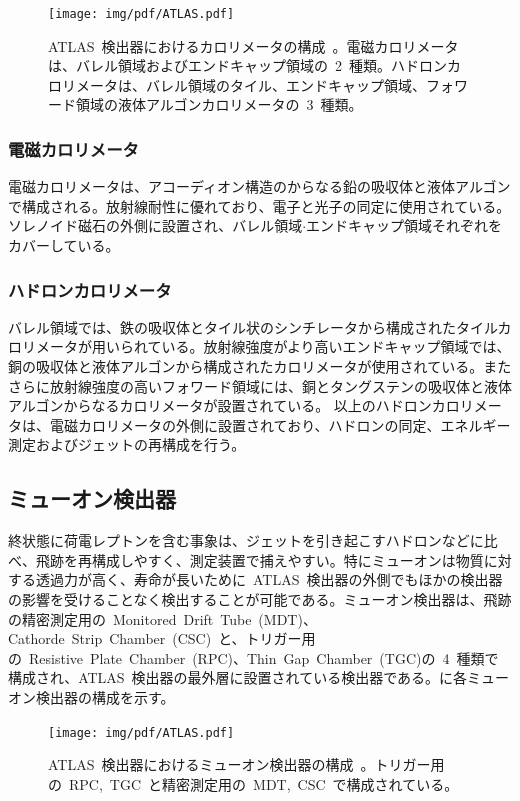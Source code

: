 \begin{figure}[tbp]
        \centering   
        \texttt{[image: img/pdf/ATLAS.pdf]}
        \caption[ATLAS~検出器におけるカロリメータの構成]{ATLAS~検出器におけるカロリメータの構成~\cite{TR:01}。電磁カロリメータは、バレル領域およびエンドキャップ領域の~2~種類。ハドロンカロリメータは、バレル領域のタイル、エンドキャップ領域、フォワード領域の液体アルゴンカロリメータの~3~種類。}\label{fig:calo}
\end{figure}

\subsubsection{電磁カロリメータ}
電磁カロリメータは、アコーディオン構造のからなる鉛の吸収体と液体アルゴンで構成される。放射線耐性に優れており、電子と光子の同定に使用されている。ソレノイド磁石の外側に設置され、バレル領域$\cdot$エンドキャップ領域それぞれをカバーしている。

\subsubsection{ハドロンカロリメータ}
バレル領域では、鉄の吸収体とタイル状のシンチレータから構成されたタイルカロリメータが用いられている。放射線強度がより高いエンドキャップ領域では、銅の吸収体と液体アルゴンから構成されたカロリメータが使用されている。またさらに放射線強度の高いフォワード領域には、銅とタングステンの吸収体と液体アルゴンからなるカロリメータが設置されている。
以上のハドロンカロリメータは、電磁カロリメータの外側に設置されており、ハドロンの同定、エネルギー測定およびジェットの再構成を行う。


\subsection{ミューオン検出器}
終状態に荷電レプトンを含む事象は、ジェットを引き起こすハドロンなどに比べ、飛跡を再構成しやすく、測定装置で捕えやすい。特にミューオンは物質に対する透過力が高く、寿命が長いために~ATLAS~検出器の外側でもほかの検出器の影響を受けることなく検出することが可能である。ミューオン検出器は、飛跡の精密測定用の~Monitored~Drift~Tube~(MDT)、Cathorde~Strip~Chamber~(CSC)~と、トリガー用の~Resistive~Plate~Chamber~(RPC)、Thin~Gap~Chamber~(TGC)の~4~種類で構成され、ATLAS~検出器の最外層に設置されている検出器である。に各ミューオン検出器の構成を示す。
\begin{figure}[tbp]
        \centering   
        \texttt{[image: img/pdf/ATLAS.pdf]}
        \caption[ATLAS~検出器におけるミューオン検出器の構成]{ATLAS~検出器におけるミューオン検出器の構成~\cite{TR:01}。トリガー用の~RPC,~TGC~と精密測定用の~MDT,~CSC~で構成されている。}\label{fig:mud}
\end{figure}

